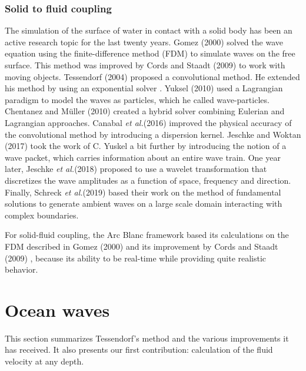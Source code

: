 \documentclass[final]{jcgt}
\def\framework{the Arc Blanc framework\xspace}
\def\etal{\emph{et al.}\xspace}
\begin{document}
\subsubsection{Solid to fluid coupling}
\label{subsubsec:solidToFluidCoupling}
The simulation of the surface of water in contact with a solid body has been an active research topic for the last twenty years.
Gomez (2000) \cite{gomezInteractiveSimulationWater2000} solved the wave equation using the finite-difference method (FDM) to simulate waves on the free surface.
This method was improved by Cords and Staadt (2009) \cite{cordsRealTimeOpenWater2009} to work with moving objects.
Tessendorf (2004) \cite{tessendorfInteractiveWaterSurface2004} proposed a convolutional method.
He extended his method by using an exponential solver \cite{tessendorfEWaveUsingExponential2014}.
Yuksel (2010) \cite{yukselRealtimeWaterWaves2010} used a Lagrangian paradigm to model the waves as particles, which he called wave-particles.
Chentanez and Müller (2010) \cite{chentanezRealTimeSimulationLarge2010} created a hybrid solver combining Eulerian and Lagrangian approaches.
Canabal  \etal (2016) \cite{canabalDispersionKernelsWater2016} improved the physical accuracy of the convolutional method by introducing a dispersion kernel.
Jeschke and Woktan (2017) \cite{jeschkeWaterWavePackets2017} took the work of C. Yuskel a bit further by introducing the notion of a wave packet, which carries information about an entire wave train.
One year later, Jeschke  \etal (2018) \cite{jeschkeWaterSurfaceWavelets2018} proposed to use a wavelet transformation that discretizes the wave amplitudes as a function of space, frequency and direction.
Finally, Schreck  \etal (2019) \cite{schreckFundamentalSolutionsWater2019} based their work on the method of fundamental solutions to generate ambient waves on a large scale domain interacting with complex boundaries.

For solid-fluid coupling, \framework based its calculations on the FDM described in Gomez (2000) \cite{gomezInteractiveSimulationWater2000} and its improvement by Cords and Staadt (2009) \cite{cordsRealTimeOpenWater2009}, because its ability to be real-time while providing quite realistic behavior.

\section{Ocean waves}
\label{sec:oceanWaves}
This section summarizes Tessendorf's method and the various improvements it has received.
It also presents our first contribution: calculation of the fluid velocity at any depth.
\end{document}
